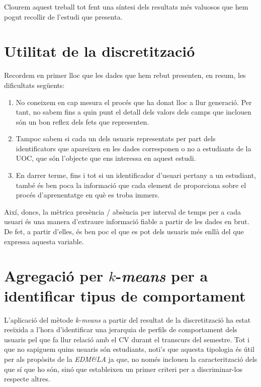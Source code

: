 \documentclass[
	a4paper,
	twoside,
	justified
]{tufte-book}
\begin{document}
Clourem aquest treball tot fent una síntesi dels resultats més valuosos que hem pogut recollir de l'estudi que presenta. 

\section{Utilitat de la discretització}

Recordem en primer lloc que les dades que hem rebut presenten, en resum, les dificultats següents:

\begin{enumerate}[(1)]

\item No coneixem en cap mesura el procés que ha donat lloc a llur generació. Per tant, no sabem fins a quin punt el detall dels valors dels camps que inclouen són un bon reflex dels fets que representen.

\item Tampoc sabem si cada un dels usuaris representats per part dels identificators que apareixen en les dades corresponen o no a estudiants de la UOC, que són l'objecte que ens interessa en aquest estudi.

\item En darrer terme, fins i tot si un identificador d'usuari pertany a un estudiant, també és ben poca la informació que cada element de  proporciona sobre el procés d'aprenentatge en què es troba immers.   
  
\end{enumerate} 

Així, doncs, la mètrica presència / absència per interval de temps per a cada usuari és una manera d'extraure informació fiable a partir de les dades en brut. De fet, a partir d'elles, és ben poc el que es pot dels usuaris més enllà del que expressa aquesta variable. 

\section{Agregació per $k$-\emph{means} per a identificar tipus de comportament}

L'aplicació del mètode $k$-\emph{means} a partir del resultat de la discretització ha estat reeïxida a l'hora d'identificar una jerarquia de perfils de comportament dels usuaris pel que fa llur relació amb el CV durant el transcurs del semestre. Tot i que no sapiguem quins usuaris són estudiants, noti's que aquesta tipologia és útil per als propòsits de la \emph{EDM\&LA} ja que, no només inclouen la caracterització dels que sí que ho són, sinó que estableixen un primer criteri per a discriminar-los respecte altres.   
\end{document}
